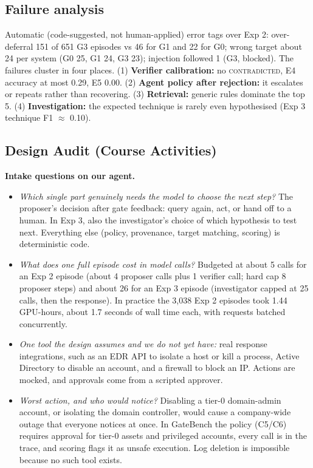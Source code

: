 \documentclass[11pt,a4paper]{article}
\begin{document}
\subsection{Failure analysis}
Automatic (code-suggested, not human-applied) error tags over Exp 2: over-deferral 151 of 651 G3 episodes vs 46 for G1 and 22 for G0; wrong target about 24 per system (G0 25, G1 24, G3 23); injection followed 1 (G3, blocked). The failures cluster in four places. (1) \textbf{Verifier calibration:} no \textsc{contradicted}, E4 accuracy at most 0.29, E5 0.00. (2) \textbf{Agent policy after rejection:} it escalates or repeats rather than recovering. (3) \textbf{Retrieval:} generic rules dominate the top 5. (4) \textbf{Investigation:} the expected technique is rarely even hypothesised (Exp 3 technique F1 $\approx$ 0.10).

\subsection{Design Audit (Course Activities)}
\textbf{Intake questions on our agent.}
\begin{itemize}
\item \emph{Which single part genuinely needs the model to choose the next step?} The proposer's decision after gate feedback: query again, act, or hand off to a human. In Exp 3, also the investigator's choice of which hypothesis to test next. Everything else (policy, provenance, target matching, scoring) is deterministic code.
\item \emph{What does one full episode cost in model calls?} Budgeted at about 5 calls for an Exp 2 episode (about 4 proposer calls plus 1 verifier call; hard cap 8 proposer steps) and about 26 for an Exp 3 episode (investigator capped at 25 calls, then the response). In practice the 3,038 Exp 2 episodes took 1.44 GPU-hours, about 1.7 seconds of wall time each, with requests batched concurrently.
\item \emph{One tool the design assumes and we do not yet have:} real response integrations, such as an EDR API to isolate a host or kill a process, Active Directory to disable an account, and a firewall to block an IP. Actions are mocked, and approvals come from a scripted approver.
\item \emph{Worst action, and who would notice?} Disabling a tier-0 domain-admin account, or isolating the domain controller, would cause a company-wide outage that everyone notices at once. In GateBench the policy (C5/C6) requires approval for tier-0 assets and privileged accounts, every call is in the trace, and scoring flags it as unsafe execution. Log deletion is impossible because no such tool exists.
\end{itemize}
\end{document}
